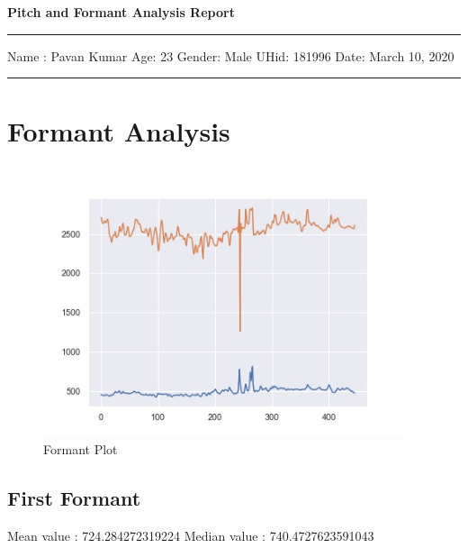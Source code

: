 \documentclass{article}%
\begin{document}
%
\normalsize%
\begin{minipage}{\textwidth}%
\centering%
\begin{Large}%
\textbf{Pitch and Formant Analysis Report\newline%
}%
\end{Large}%
\noindent\rule{\textwidth}{1pt}%
\newline%
\linebreak%
\begin{minipage}{\textwidth}%
\flushleft%
Name : Pavan Kumar%
\newline%
Age: 23%
\newline%
Gender: Male%
\newline%
UHid: 181996%
\newline%
Date: March 10, 2020%
\linebreak%
\noindent\rule{\textwidth}{1pt}%
\newline%
\end{minipage}%
\end{minipage}%
\section{Formant Analysis}%
\label{sec:FormantAnalysis}%


\begin{figure}[h!]%
\centering%
\includegraphics[width=400px]{formant.jpg}%
\caption{Formant Plot}%
\end{figure}

%
\subsection{First Formant}%
\label{subsec:FirstFormant}%
Mean value : 724.284272319224%
\newline%
Median value : 740.4727623591043

%
\end{document}

